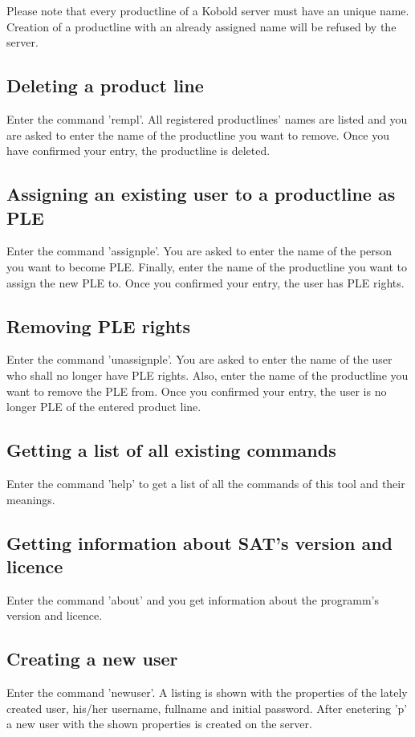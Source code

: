 Please note that every productline of a Kobold server must have an unique name. Creation
of a productline with an already assigned name will be refused by the server.

\subsection{Deleting a product line}
Enter the command 'rempl'. All registered productlines' names are listed and you are 
asked to enter the name of the productline you want to remove. Once you have confirmed your 
entry, the productline is deleted.

\subsection{Assigning an existing user to a productline as PLE}
Enter the command 'assignple'. You are asked to enter the name of the person you want
to become PLE. Finally, enter the name of the productline you want to assign the new 
PLE to. Once you confirmed your entry, the user has PLE rights.

\subsection{Removing PLE rights}
Enter the command 'unassignple'. You are asked to enter the name of the user who shall 
no longer have PLE rights. Also, enter the name of the productline you want to
remove the PLE from. Once you confirmed your entry, the user is no longer PLE of
the entered product line.

\subsection{Getting a list of all existing commands}
Enter the command 'help' to get a list of all the commands of this tool and
their meanings.

\subsection{Getting information about SAT's version and licence}
Enter the command 'about' and you get information about the programm's version and licence.

\subsection{Creating a new user}
Enter the command 'newuser'. A listing is shown with the properties of the lately created
user, his/her username, fullname and initial password. After enetering 'p' a new user with
the shown properties is created on the server.\par

